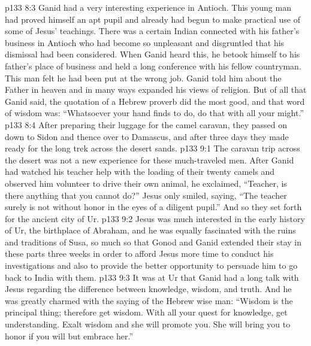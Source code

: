 \vs p133 8:3 \pc Ganid had a very interesting experience in Antioch. This young man had proved himself an apt pupil and already had begun to make practical use of some of Jesus’ teachings. There was a certain Indian connected with his father’s business in Antioch who had become so unpleasant and disgruntled that his dismissal had been considered. When Ganid heard this, he betook himself to his father’s place of business and held a long conference with his fellow countryman. This man felt he had been put at the wrong job. Ganid told him about the Father in heaven and in many ways expanded his views of religion. But of all that Ganid said, the quotation of a Hebrew proverb did the most good, and that word of wisdom was: “Whatsoever your hand finds to do, do that with all your might.”
\vs p133 8:4 After preparing their luggage for the camel caravan, they passed on down to Sidon and thence over to Damascus, and after three days they made ready for the long trek across the desert sands.
\vs p133 9:1 The caravan trip across the desert was not a new experience for these much\hyp{}traveled men. After Ganid had watched his teacher help with the loading of their twenty camels and observed him volunteer to drive their own animal, he exclaimed, “Teacher, is there anything that you cannot do?” Jesus only smiled, saying, \textcolor{ubdarkred}{“The teacher surely is not without honor in the eyes of a diligent pupil.”} And so they set forth for the ancient city of Ur.
\vs p133 9:2 Jesus was much interested in the early history of Ur, the birthplace of Abraham, and he was equally fascinated with the ruins and traditions of Susa, so much so that Gonod and Ganid extended their stay in these parts three weeks in order to afford Jesus more time to conduct his investigations and also to provide the better opportunity to persuade him to go back to India with them.
\vs p133 9:3 It was at Ur that Ganid had a long talk with Jesus regarding the difference between knowledge, wisdom, and truth. And he was greatly charmed with the saying of the Hebrew wise man: \textcolor{ubdarkred}{“Wisdom is the principal thing; therefore get wisdom. With all your quest for knowledge, get understanding. Exalt wisdom and she will promote you. She will bring you to honor if you will but embrace her.”}
